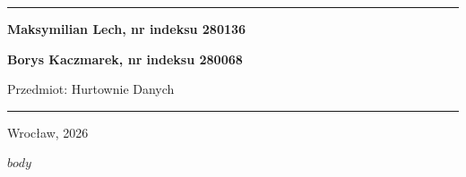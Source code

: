 \documentclass[11pt,a4paper]{article}
\begin{document}
\begin{titlepage}
  \thispagestyle{empty}
  \vspace*{1.4cm}
  {\color{tepblue}\rule{\textwidth}{2.2pt}}
  \vspace{1.1cm}

  {\large\bfseries\color{tepblue}{$documenttype$}\par}
  \vspace{1.2cm}
  {\raggedright\fontsize{24}{30}\selectfont\bfseries\color{tepnavy}{$title$}\par}
  \vspace{0.55cm}
  {\Large\color{tepgray}{$subtitle$}\par}

  \vfill
  {\large\bfseries Maksymilian Lech, nr indeksu 280136\par}
  \vspace{0.2cm}
  {\large\bfseries Borys Kaczmarek, nr indeksu 280068\par}
  \vspace{0.75cm}
  {\large Przedmiot: Hurtownie Danych\par}

  \vfill
  {\color{tepblue}\rule{\textwidth}{1.1pt}}
  \vspace{0.35cm}
  {\large Wrocław, 2026\par}
\end{titlepage}

\tableofcontents
\clearpage
{}

$body$
\end{document}
